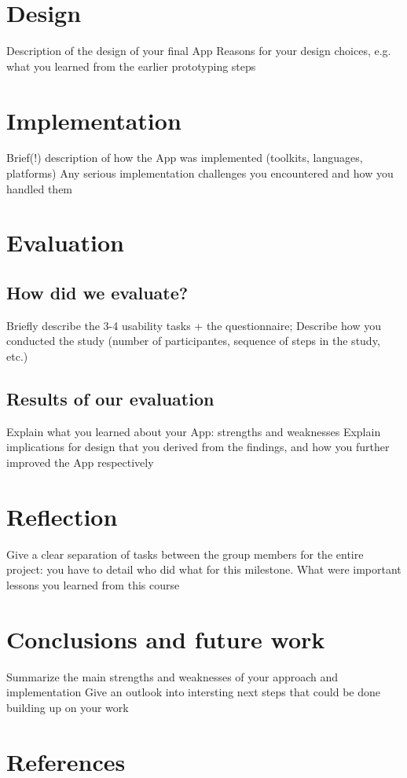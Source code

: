 \documentclass{sigchi}
\begin{document}
\section{Design}
Description of the design of your final App
Reasons for your design choices, e.g. what you learned from the earlier prototyping steps
\section{Implementation}
Brief(!) description of how the App was implemented (toolkits, languages, platforms)
Any serious implementation challenges you encountered and how you handled them
\section{Evaluation}
\subsection{How did we evaluate?}
Briefly describe the 3-4 usability tasks + the questionnaire;
Describe how you conducted the study (number of participantes, sequence of steps in the study, etc.)
\subsection{Results of our evaluation}
Explain what you learned about your App: strengths and weaknesses
Explain implications for design that you derived from the findings, and how you further improved the App respectively
\section{Reflection}
Give a clear separation of tasks between the group members for the entire project: you have to detail who did what for this milestone.
What were important lessons you learned from this course
\section{Conclusions and future work}
Summarize the main strengths and weaknesses of your approach and implementation
Give an outlook into intersting next steps that could be done building up on your work
\section{References}

\cite{CHINOSAUR:venue}



\end{document}
